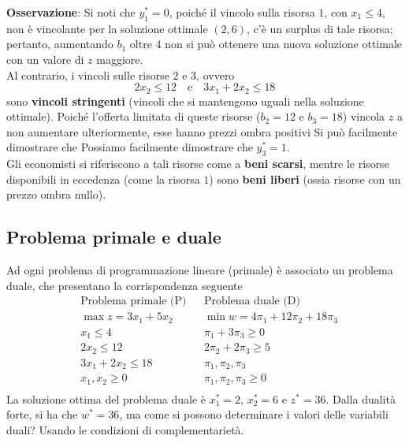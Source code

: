 \documentclass[a4paper]{extarticle}
\begin{document}
\vspace{2em}
\noindent
\textbf{Osservazione}: Si noti che $y_1^* = 0$, poiché il vincolo sulla risorsa $1$, con $x_1 \leq 4$, non è vincolante per la soluzione ottimale $(2,6)$, c'è un surplus di tale risorsa; pertanto, aumentando $b_1$ oltre $4$ non si può ottenere una nuova soluzione ottimale con un valore di $z$ maggiore.\\
Al contrario, i vincoli sulle risorse $2$ e $3$, ovvero
\[2x_2 \leq 12 \hspace{1em} \text{e} \hspace{1em} 3x_1 + 2x_2 \leq 18\]
sono \textbf{vincoli stringenti} (vincoli che si mantengono uguali nella soluzione ottimale). Poiché l'offerta limitata di queste risorse ($b_2 = 12$ e $b_3 = 18$) vincola $z$ a non aumentare ulteriormente, esse hanno prezzi ombra positivi Si può facilmente dimostrare che Possiamo facilmente dimostrare che $y_3^*= 1$.\\
Gli economisti si riferiscono a tali risorse come a \textbf{beni scarsi}, mentre le risorse disponibili in eccedenza (come la risorsa $1$) sono \textbf{beni liberi} (ossia risorse con un prezzo ombra nullo).

\vspace{1em}
\noindent
\subsection{Problema primale e duale}
Ad ogni problema di programmazione lineare (primale) è associato un problema duale, che presentano la corrispondenza seguente
\begin{align*}
    &\text{Problema primale (P)} && \text{Problema duale (D)}\\
    &\max z=3x_1+5x_2   && \min w=4 \pi_1+12\pi_2+18\pi_3\\
    &x_1 \leq 4 && \pi_1+3\pi_3 \geq 0\\
    &2x_2 \leq 12 && 2\pi_2+2\pi_3 \geq 5\\
    &3x_1+2x_2 \leq 18 && \pi_1,\pi_2,\pi_3\\
    &x_1,x_2 \geq 0 && \pi_1,\pi_2,\pi_3 \geq 0\\
\end{align*}
La soluzione ottima del problema duale è $x_1^*=2$, $x_2^*=6$ e $z^*=36$. Dalla dualità forte, si ha che $w^*=36$, ma come si possono determinare i valori delle variabili duali? Usando le condizioni di complementarietà.

\vspace{1em}
\noindent
\end{document}
